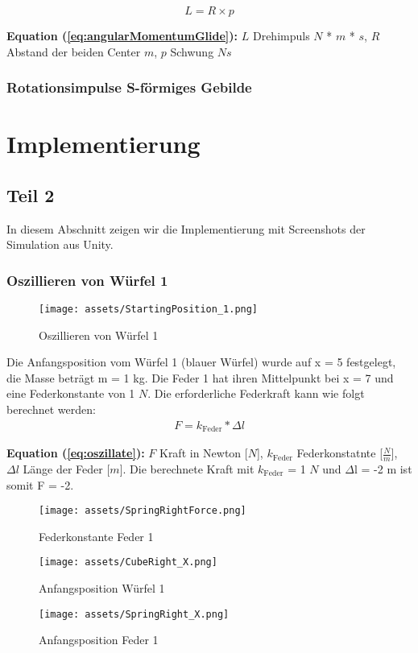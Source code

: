 \documentclass{article}
\begin{document}
\begin{equation}\label{eq:angularMomentumGlide}
L = R \times p
\end{equation}

\scriptsize
\textbf{Equation (\ref{eq:angularMomentumGlide}):} $L$ Drehimpuls $N$ * $m$ * $s$, $R$ Abstand der beiden Center $m$, $p$ Schwung $Ns$
\subsubsection{Rotationsimpulse S-förmiges Gebilde}
\normalsize
\medskip

\newpage

\section{Implementierung}
\subsection{Teil 2}
In diesem Abschnitt zeigen wir die Implementierung mit Screenshots der Simulation aus Unity.
\subsubsection{Oszillieren von Würfel 1}
\begin{figure}[H] 
\centering\texttt{[image: assets/StartingPosition\_1.png]}
\scriptsize
\caption{Oszillieren von Würfel 1}
\label{fig:StartingPosition_1}
\end{figure}
Die Anfangsposition vom Würfel 1 (blauer Würfel) wurde auf x = 5 festgelegt, die Masse beträgt m = 1 kg. Die Feder 1 hat ihren Mittelpunkt bei x = 7 und eine Federkonstante von 1 $N$. Die erforderliche Federkraft kann wie folgt berechnet werden:
\begin{subequations}\label{eq:oszillate}
    \begin{align}
    F =  k_{\text{Feder}} * \Delta l
    \end{align}
\end{subequations}

\scriptsize
\textbf{Equation (\ref{eq:oszillate}):} $F$ Kraft in Newton [$N$], $k_{\text{Feder}}$ Federkonstatnte [$\frac{N}{m}$], $\Delta l$ Länge der Feder [$m$].
\normalsize
\medskip
\newline
Die berechnete Kraft mit $k_{\text{Feder}}$ = 1 $N$ und \( \Delta \)l = -2 m ist somit F = -2.
\begin{figure}[H] 
\centering\texttt{[image: assets/SpringRightForce.png]}
\scriptsize
\caption{Federkonstante Feder 1}
\label{fig:SpringRightForce}
\end{figure}
\begin{figure}[H] 
\centering\texttt{[image: assets/CubeRight\_X.png]}
\scriptsize
\caption{Anfangsposition Würfel 1}
\label{fig:CubeRight_X}
\end{figure}
\begin{figure}[H] 
\centering\texttt{[image: assets/SpringRight\_X.png]}
\scriptsize
\caption{Anfangsposition Feder 1}
\label{fig:SpringRight_X}
\end{figure}
\end{document}
